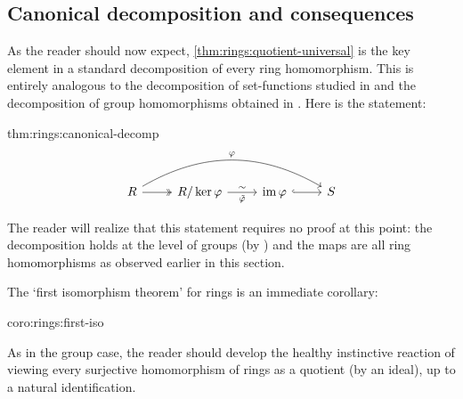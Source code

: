 \subsection{Canonical decomposition and consequences}
\label{subsec:rings:canonical-decomposition-and-consequences}
As the reader should now expect, \cref{thm:rings:quotient-universal}
is the key element in a standard decomposition of every ring
homomorphism. This is entirely analogous to the decomposition of
set-functions studied in
 and the decomposition
of group homomorphisms obtained in
. Here is the
statement:
\begin{thm}{}{thm:rings:canonical-decomp}
  \[
    \begin{tikzcd}
      R \arrow[r, two heads] \arrow[rrr, bend left, "\varphi"] &
      R/\ker\varphi \arrow[r, "\tilde{\varphi}"', "\sim"] &
      \image\varphi \arrow[r, hook] & S
    \end{tikzcd}
  \]
\end{thm}
The reader will realize that this statement requires no proof at this
point: the decomposition holds at the level of groups (by
) and the maps are all ring
homomorphisms as observed earlier in this section.

The `first isomorphism theorem' for rings is an immediate corollary:
\begin{coro}{}{coro:rings:first-iso}
\end{coro}
As in the group case, the reader should develop the healthy
instinctive reaction of viewing every surjective homomorphism of rings
as a quotient (by an ideal), up to a natural identification.

